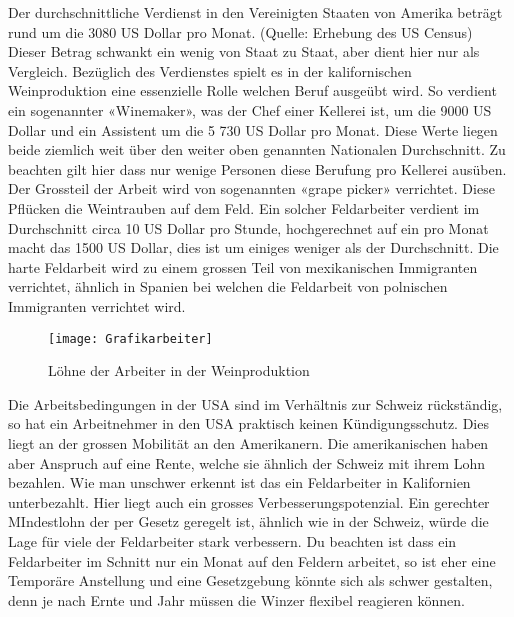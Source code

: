 Der durchschnittliche Verdienst in den Vereinigten Staaten von Amerika beträgt rund um die 3080 US Dollar pro Monat. (Quelle: Erhebung des US Census) Dieser Betrag schwankt ein wenig von Staat zu Staat, aber dient hier nur als Vergleich. Bezüglich des Verdienstes spielt es in der kalifornischen Weinproduktion eine essenzielle Rolle welchen Beruf ausgeübt wird. So verdient ein sogenannter «Winemaker», was der Chef einer Kellerei ist, um die 9000 US
Dollar und ein Assistent um die 5 730 US Dollar pro Monat. Diese Werte liegen beide ziemlich weit über den weiter oben genannten Nationalen Durchschnitt. Zu beachten gilt hier dass nur wenige Personen diese Berufung pro Kellerei ausüben. Der Grossteil der Arbeit
wird von sogenannten «grape picker» verrichtet. Diese Pflücken die Weintrauben auf dem Feld. Ein solcher Feldarbeiter verdient im Durchschnitt circa 10 US Dollar pro Stunde,
\cite{_farm_????} hochgerechnet auf ein pro Monat macht das 1500 US Dollar, dies ist um einiges weniger als der Durchschnitt. Die harte Feldarbeit wird zu einem grossen Teil von mexikanischen Immigranten verrichtet, ähnlich in Spanien bei welchen die Feldarbeit von polnischen Immigranten verrichtet wird.
  \begin{figure}[H]
	\centering
	\texttt{[image: Grafikarbeiter]}
	\caption{Löhne der Arbeiter in der Weinproduktion}
\end{figure}
Die Arbeitsbedingungen in der USA sind im Verhältnis zur Schweiz rückständig, so hat ein Arbeitnehmer in den USA praktisch keinen Kündigungsschutz. Dies liegt an der grossen Mobilität an den Amerikanern. Die amerikanischen haben aber Anspruch auf eine Rente, welche sie ähnlich der Schweiz mit ihrem Lohn bezahlen. \cite{_arbeitszeiten_????} Wie man unschwer erkennt ist das ein Feldarbeiter in Kalifornien unterbezahlt. Hier liegt auch ein grosses Verbesserungspotenzial. Ein gerechter MIndestlohn der per Gesetz geregelt ist, ähnlich wie in der Schweiz, würde die Lage für viele der Feldarbeiter stark verbessern. Du beachten ist dass ein Feldarbeiter im Schnitt nur ein Monat auf den Feldern arbeitet, so ist eher eine Temporäre Anstellung und eine Gesetzgebung könnte sich als schwer gestalten, denn je nach Ernte und Jahr  müssen die Winzer flexibel reagieren können.





